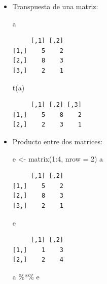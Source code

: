 \documentclass[
]{book}
\newenvironment{Shaded}{\begin{snugshade}}{\end{snugshade}}
\newcommand{\AttributeTok}[1]{\textcolor[rgb]{0.77,0.63,0.00}{#1}}
\newcommand{\DecValTok}[1]{\textcolor[rgb]{0.00,0.00,0.81}{#1}}
\newcommand{\FunctionTok}[1]{\textcolor[rgb]{0.00,0.00,0.00}{#1}}
\newcommand{\NormalTok}[1]{#1}
\newcommand{\OtherTok}[1]{\textcolor[rgb]{0.56,0.35,0.01}{#1}}
\newcommand{\SpecialCharTok}[1]{\textcolor[rgb]{0.00,0.00,0.00}{#1}}
\begin{document}
\begin{itemize}
\item
  Transpuesta de una matriz:

\begin{Shaded}
\begin{Highlighting}[]
\NormalTok{a}
\end{Highlighting}
\end{Shaded}

\begin{verbatim}
     [,1] [,2]
[1,]    5    2
[2,]    8    3
[3,]    2    1
\end{verbatim}

\begin{Shaded}
\begin{Highlighting}[]
\FunctionTok{t}\NormalTok{(a)}
\end{Highlighting}
\end{Shaded}

\begin{verbatim}
     [,1] [,2] [,3]
[1,]    5    8    2
[2,]    2    3    1
\end{verbatim}
\item
  Producto entre dos matrices:

\begin{Shaded}
\begin{Highlighting}[]
\NormalTok{e }\OtherTok{\textless{}{-}} \FunctionTok{matrix}\NormalTok{(}\DecValTok{1}\SpecialCharTok{:}\DecValTok{4}\NormalTok{, }\AttributeTok{nrow =} \DecValTok{2}\NormalTok{)}
\NormalTok{a}
\end{Highlighting}
\end{Shaded}

\begin{verbatim}
     [,1] [,2]
[1,]    5    2
[2,]    8    3
[3,]    2    1
\end{verbatim}

\begin{Shaded}
\begin{Highlighting}[]
\NormalTok{e}
\end{Highlighting}
\end{Shaded}

\begin{verbatim}
     [,1] [,2]
[1,]    1    3
[2,]    2    4
\end{verbatim}

\begin{Shaded}
\begin{Highlighting}[]
\NormalTok{a }\SpecialCharTok{\%*\%}\NormalTok{ e}
\end{Highlighting}
\end{Shaded}


\end{itemize}
\end{document}

